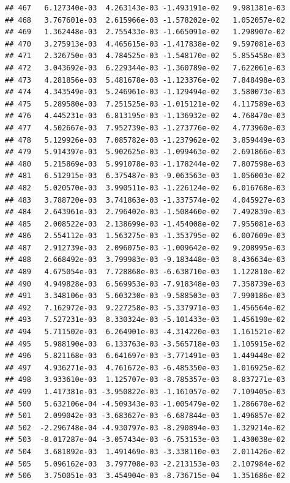 \documentclass[
]{article}
\begin{document}
\begin{verbatim}
## 467   6.127340e-03  4.263143e-03 -1.493191e-02   9.981381e-03
## 468   3.767601e-03  2.615966e-03 -1.578202e-02   1.052057e-02
## 469   1.362448e-03  2.755433e-03 -1.665091e-02   1.298907e-02
## 470   3.275913e-03  4.465615e-03 -1.417838e-02   9.597081e-03
## 471   2.326750e-03  4.784525e-03 -1.548170e-02   5.855458e-03
## 472   3.043692e-03  6.229344e-03 -1.360789e-02   7.622061e-03
## 473   4.281856e-03  5.481678e-03 -1.123376e-02   7.848498e-03
## 474   4.343549e-03  5.246961e-03 -1.129494e-02   3.580073e-03
## 475   5.289580e-03  7.251525e-03 -1.015121e-02   4.117589e-03
## 476   4.445231e-03  6.813195e-03 -1.136932e-02   4.768470e-03
## 477   4.502667e-03  7.952739e-03 -1.273776e-02   4.773960e-03
## 478   5.129926e-03  7.085782e-03 -1.237962e-02   3.859449e-03
## 479   5.914397e-03  5.902625e-03 -1.099463e-02   2.691866e-03
## 480   5.215869e-03  5.991078e-03 -1.178244e-02   7.807598e-03
## 481   6.512915e-03  6.375487e-03 -9.063563e-03   1.056003e-02
## 482   5.020570e-03  3.990511e-03 -1.226124e-02   6.016768e-03
## 483   3.788720e-03  3.741863e-03 -1.337574e-02   4.045927e-03
## 484   2.643961e-03  2.796402e-03 -1.508460e-02   7.492839e-03
## 485   2.008522e-03  2.138699e-03 -1.454008e-02   7.955081e-03
## 486   2.554112e-03  1.563275e-03 -1.353795e-02   6.007609e-03
## 487   2.912739e-03  2.096075e-03 -1.009642e-02   9.208995e-03
## 488   2.668492e-03  3.799983e-03 -9.183448e-03   8.436634e-03
## 489   4.675054e-03  7.728868e-03 -6.638710e-03   1.122810e-02
## 490   4.949828e-03  6.569953e-03 -7.918348e-03   7.358739e-03
## 491   3.348106e-03  5.603230e-03 -9.588503e-03   7.990186e-03
## 492   7.162972e-03  9.227258e-03 -5.337971e-03   1.456564e-02
## 493   7.527231e-03  8.330324e-03 -5.101433e-03   1.456190e-02
## 494   5.711502e-03  6.264901e-03 -4.314220e-03   1.161521e-02
## 495   5.988190e-03  6.133763e-03 -3.565718e-03   1.105915e-02
## 496   5.821168e-03  6.641697e-03 -3.771491e-03   1.449448e-02
## 497   4.936271e-03  4.761672e-03 -6.485350e-03   1.016925e-02
## 498   3.933610e-03  1.125707e-03 -8.785357e-03   8.837271e-03
## 499   1.417381e-03 -3.950822e-03 -1.161057e-02   7.109405e-03
## 500   5.632106e-04 -4.509343e-03 -1.005479e-02   1.286670e-02
## 501   2.099042e-03 -3.683627e-03 -6.687844e-03   1.496857e-02
## 502  -2.296748e-04 -4.930797e-03 -8.290894e-03   1.329214e-02
## 503  -8.017287e-04 -3.057434e-03 -6.753153e-03   1.430038e-02
## 504   3.681892e-03  1.491469e-03 -3.338110e-03   2.011426e-02
## 505   5.096162e-03  3.797708e-03 -2.213153e-03   2.107984e-02
## 506   3.750051e-03  3.454904e-03 -8.736715e-04   1.351686e-02

\end{verbatim}
\end{document}
